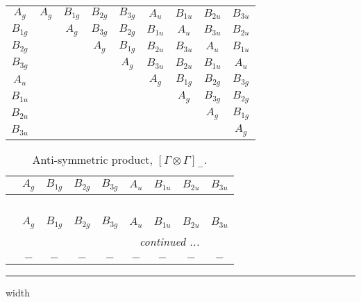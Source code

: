 \documentclass[fleqn,10pt,landscape]{article}
\begin{document}
\begin{itemize}
\begin{center}
\begin{longtable}{c|cccccccc}
$ A_{g} $ & $ A_{g} $ & $ B_{1g} $ & $ B_{2g} $ & $ B_{3g} $ & $ A_{u} $ & $ B_{1u} $ & $ B_{2u} $ & $ B_{3u} $ \\
$ B_{1g} $ & $  $ & $ A_{g} $ & $ B_{3g} $ & $ B_{2g} $ & $ B_{1u} $ & $ A_{u} $ & $ B_{3u} $ & $ B_{2u} $ \\
$ B_{2g} $ & $  $ & $  $ & $ A_{g} $ & $ B_{1g} $ & $ B_{2u} $ & $ B_{3u} $ & $ A_{u} $ & $ B_{1u} $ \\
$ B_{3g} $ & $  $ & $  $ & $  $ & $ A_{g} $ & $ B_{3u} $ & $ B_{2u} $ & $ B_{1u} $ & $ A_{u} $ \\
$ A_{u} $ & $  $ & $  $ & $  $ & $  $ & $ A_{g} $ & $ B_{1g} $ & $ B_{2g} $ & $ B_{3g} $ \\
$ B_{1u} $ & $  $ & $  $ & $  $ & $  $ & $  $ & $ A_{g} $ & $ B_{3g} $ & $ B_{2g} $ \\
$ B_{2u} $ & $  $ & $  $ & $  $ & $  $ & $  $ & $  $ & $ A_{g} $ & $ B_{1g} $ \\
$ B_{3u} $ & $  $ & $  $ & $  $ & $  $ & $  $ & $  $ & $  $ & $ A_{g} $ \\
\end{longtable}
\end{center}
\begin{center}
\renewcommand{\arraystretch}{1.0}
\begin{longtable}{ccccccccc}
\caption{Anti-symmetric product, $[\Gamma\otimes\Gamma]_-$.}
 \\
 \hline \hline
 & $ A_{g} $ & $ B_{1g} $ & $ B_{2g} $ & $ B_{3g} $ & $ A_{u} $ & $ B_{1u} $ & $ B_{2u} $ & $ B_{3u} $ \\ \hline \endfirsthead

\multicolumn{8}{l}{\tablename\ \thetable{}} \\
 \hline \hline
 & $ A_{g} $ & $ B_{1g} $ & $ B_{2g} $ & $ B_{3g} $ & $ A_{u} $ & $ B_{1u} $ & $ B_{2u} $ & $ B_{3u} $ \\ \hline \endhead

 \hline \hline
\multicolumn{8}{r}{\footnotesize\it continued ...} \\ \endfoot

 \hline \hline
\multicolumn{8}{r}{} \\ \endlastfoot

$  $ & $ - $ & $ - $ & $ - $ & $ - $ & $ - $ & $ - $ & $ - $ & $ - $ \\
\end{longtable}
\end{center}

 \hfil \hrule height 1mm width \textwidth \hfil


\end{itemize}
\end{document}
